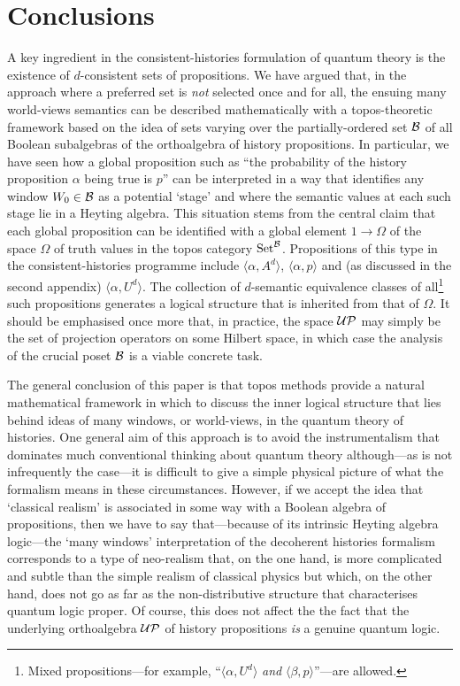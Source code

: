 \documentclass[12pt]{article}
\let\ssection=\section
\renewcommand{\section}{\setcounter{equation}{0}\ssection}
\newcounter{def-number}[section]
\renewcommand{\a}{\alpha}                   %
\renewcommand{\b}{\beta}                    %
\newcommand{\gp}[2]{\langle#1,#2\rangle}
\newcommand{\map}{\rightarrow}
\newcommand{\B}{{\cal B}}
\newcommand{\Om}{\Omega}
\newcommand{\UP}{{\cal UP}}
\newcommand{\Set}{{\rm Set}}
\newcommand{\SetB}{{\Set^{\cal B}}}
\begin{document}
\section{Conclusions}
A key ingredient in the consistent-histories formulation of quantum
theory is the existence of $d$-consistent sets of propositions. We
have argued that, in the approach where a preferred set is {\em
not\/} selected once and for all, the ensuing many world-views
semantics can be described mathematically with a topos-theoretic
framework based on the idea of sets varying over the
partially-ordered set $\B$ of all Boolean subalgebras of the
orthoalgebra of history propositions. In particular, we have seen
how a global proposition such as ``the probability of the history
proposition $\a$ being true is $p$'' can be interpreted in a way
that identifies any window $W_0\in\B$ as a potential `stage' and
where the semantic values at each such stage lie in a Heyting
algebra.  This situation stems from the central claim that each
global proposition can be identified with a global element
$1\map\Om$ of the space $\Om$ of truth values in the topos category
$\SetB$.  Propositions of this type in the consistent-histories
programme include $\gp{\a}{A^d}$, $\gp{\a}p$ and (as discussed in
the second appendix) $\gp{\a}{U^d}$.  The collection of $d$-semantic
equivalence classes of all\footnote{Mixed propositions---for
example, ``$\gp{\a}{U^d}$ {\em and } $\gp{\b}p$''---are allowed.}
such propositions generates a logical structure that is inherited
from that of $\Om$. It should be emphasised once more that, in
practice, the space $\UP$ may simply be the set of projection
operators on some Hilbert space, in which case the analysis of the
crucial poset $\B$ is a viable concrete task.

	The general conclusion of this paper is that topos methods
provide a natural mathematical framework in which to discuss the
inner logical structure that lies behind ideas of many windows, or
world-views, in the quantum theory of histories. One general aim of
this approach is to avoid the instrumentalism that dominates much
conventional thinking about quantum theory although---as is not
infrequently the case---it is difficult to give a simple physical
picture of what the formalism means in these circumstances. However,
if we accept the idea that `classical realism' is associated in some
way with a Boolean algebra of propositions, then we have to say
that---because of its intrinsic Heyting algebra logic---the `many
windows' interpretation of the decoherent histories formalism
corresponds to a type of neo-realism that, on the one hand, is more
complicated and subtle than the simple realism of classical physics
but which, on the other hand, does not go as far as the
non-distributive structure that characterises quantum logic proper.
Of course, this does not affect the the fact that the underlying
orthoalgebra $\UP$ of history propositions {\em is\/} a genuine
quantum logic.
\end{document}
